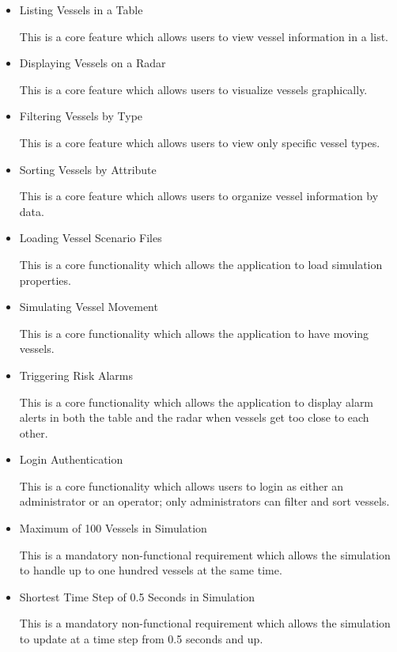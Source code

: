 \documentclass[12pt]{article}
\begin{document}
\begin{itemize}
\item Listing Vessels in a Table\par
This is a core feature which allows users to view vessel information in a list.
\item Displaying Vessels on a Radar\par
This is a core feature which allows users to visualize vessels graphically.
\item Filtering Vessels by Type\par
This is a core feature which allows users to view only specific vessel types.
\item Sorting Vessels by Attribute\par
This is a core feature which allows users to organize vessel information by data.
\item Loading Vessel Scenario Files\par
This is a core functionality which allows the application to load simulation properties.
\item Simulating Vessel Movement\par
This is a core functionality which allows the application to have moving vessels.
\item Triggering Risk Alarms\par
This is a core functionality which allows the application to display alarm alerts in both the table and the radar when vessels get too close to each other.
\item Login Authentication\par
This is a core functionality which allows users to login as either an administrator or an operator; only administrators can filter and sort vessels.
\item Maximum of 100 Vessels in Simulation\par
This is a mandatory non-functional requirement which allows the simulation to handle up to one hundred vessels at the same time.
\item Shortest Time Step of 0.5 Seconds in Simulation\par
This is a mandatory non-functional requirement which allows the simulation to update at a time step from 0.5 seconds and up.
\end{itemize}

\clearpage
\end{document}
